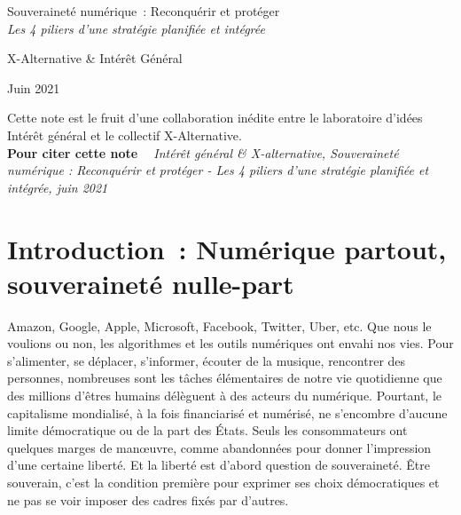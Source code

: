 \documentclass[a4paper]{article}
\begin{document}
\begin{titlepage}
    \begin{center}
		{\Large Souveraineté numérique~: Reconquérir et protéger}\\
		{\large\textit{Les 4 piliers d’une stratégie planifiée et intégrée}}\par
		\vspace{2cm}
		{\large X-Alternative \& Intérêt Général\par}
		{\large Juin 2021\par}
		\vfill
	\end{center}
	Cette note est le fruit d’une collaboration inédite entre le laboratoire d’idées Intérêt général et le collectif X-Alternative.\\ 
	\textbf{Pour citer cette note ~} \textit{Intérêt général \& X-alternative, Souveraineté numérique : Reconquérir et protéger - Les 4 piliers d’une stratégie planifiée et intégrée, juin 2021}

\end{titlepage} 

\newpage
\tableofcontents
{}
\newpage

\section*{Introduction~: Numérique partout, souveraineté nulle-part}
Amazon, Google, Apple, Microsoft, Facebook, Twitter, Uber, etc. Que nous le voulions ou non, les algorithmes et les outils numériques ont envahi nos vies. Pour s’alimenter, se déplacer, s’informer, écouter de la musique, rencontrer des personnes, nombreuses sont les tâches élémentaires de notre vie quotidienne que des millions d’êtres humains délèguent à des acteurs du numérique. Pourtant, le capitalisme mondialisé, à la fois financiarisé et numérisé, ne s’encombre d’aucune limite démocratique ou de la part des États. Seuls les consommateurs ont quelques marges de manœuvre, comme abandonnées pour donner l’impression d’une certaine liberté. Et la liberté est d’abord question de souveraineté. Être souverain, c’est la condition première pour exprimer ses choix démocratiques et ne pas se voir imposer des cadres fixés par d’autres.\par
\end{document}
